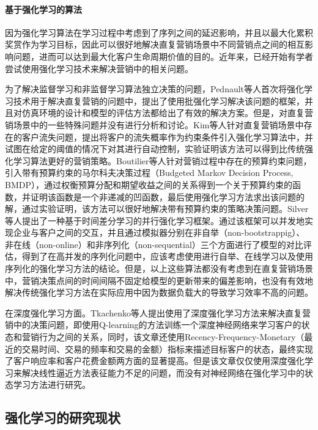 \paragraph{基于强化学习的算法}
因为强化学习算法在学习过程中考虑到了序列之间的延迟影响，并且以最大化累积奖赏作为学习目标，因此可以很好地解决直复营销场景中不同营销点之间的相互影响问题，进而可以达到最大化客户生命周期价值的目的。近年来，已经开始有学者尝试使用强化学习技术来解决营销中的相关问题。

为了解决监督学习和非监督学习算法独立决策的问题，Pednault等人首次将强化学习技术用于解决直复营销的问题中，提出了使用批强化学习解决该问题的框架，并且对仿真环境的设计和模型的评估方法都给出了有效的解决方案\citep{pednault2002sequential}。但是，对直复营销场景中的一些特殊问题并没有进行分析和讨论。Kim等人针对直复营销场景中存在的客户流失问题，提出将客户的流失概率作为约束条件引入强化学习算法中，并试图在给定的阈值的情况下对其进行自动控制，实验证明该方法可以得到比传统强化学习算法更好的营销策略\citep{kim2009new}。Boutilier等人针对营销过程中存在的预算约束问题，引入带有预算约束的马尔科夫决策过程（Budgeted Markov Decision Process, BMDP），通过权衡预算分配和期望收益之间的关系得到一个关于预算约束的函数，并证明该函数是一个非递减的凹函数，最后使用强化学习方法求出该问题的解，通过实验证明，该方法可以很好地解决带有预算约束的策略决策问题\citep{boutilier2016budget}。Silver等人提出了一种基于时间差分学习的并行强化学习框架。通过该框架可以并发地实现企业与客户之间的交互，并且通过模拟器分别在非自举（non-bootstrappig）、非在线（non-online）和非序列化（non-sequential）三个方面进行了模型的对比评估，得到了在高并发的序列化问题中，应该考虑使用进行自举、在线学习以及使用序列化的强化学习方法的结论\citep{silver2013concurrent}。但是，以上这些算法都没有考虑到在直复营销场景中，营销决策点间的时间间隔不固定给模型的更新带来的偏差影响，也没有有效地解决传统强化学习方法在实际应用中因为数据负载大的导致学习效率不高的问题。

在深度强化学习方面。Tkachenko等人提出使用了深度强化学习方法来解决直复营销中的决策问题，即使用Q-learning的方法训练一个深度神经网络来学习客户的状态和营销行为之间的关系，同时，该文章还使用Recency-Frequency-Monetary（最近的交易时间、交易的频率和交易的金额）指标来描述目标客户的状态，最终实现了客户响应率和客户花费金额两方面的显著提高\citep{tkachenko2015autonomous}。但是该文章仅仅使用深度强化学习来解决线性逼近方法表征能力不足的问题，而没有对神经网络在强化学习中的状态学习方法进行研究。

\subsection{强化学习的研究现状}

